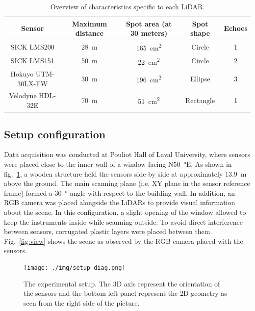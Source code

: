 \begin{table}[htbp]
    \centering
    \begin{tabular}{|c|c|c|c|c|}
        \hline
        \textbf{Sensor}     & \textbf{Maximum distance}  & \textbf{Spot area (at 30 meters)}  & \textbf{Spot shape} & \textbf{Echoes} \\\hline
        SICK LMS200         & \SI{28}{\meter}            & \SI{165}{\centi\meter\squared}     & Circle              & 1               \\\hline
        SICK LMS151         & \SI{50}{\meter}            & \SI{22}{\centi\meter\squared}      & Circle              & 2               \\\hline
        Hokuyo UTM-30LX-EW  & \SI{30}{\meter}            & \SI{196}{\centi\meter\squared}     & Ellipse             & 3               \\\hline
        Velodyne HDL-32E    & \SI{70}{\meter}            & \SI{51}{\centi\meter\squared}      & Rectangle           & 1               \\\hline
    \end{tabular}
    \caption{Overview of characteristics specific to each LiDAR.}
    \label{tab:lidars}
\end{table}

\subsection{Setup configuration}

Data acquisition was conducted at Pouliot Hall of Laval University, where sensors were placed close to the inner wall of a window facing N\SI{50}{\degree}E. As shown in fig.~\ref{fig:setup}, a wooden structure held the sensors side by side at approximately \SI{13.9}{\meter} above the ground. The main scanning plane (i.e. XY plane in the sensor reference frame) formed a \SI{30}{\degree} angle with respect to the building wall. In addition, an RGB camera was placed alongside the LiDARs to provide visual information about the scene. In this configuration, a slight opening of the window allowed to keep the instruments inside while scanning outside. To avoid direct interference between sensors, corrugated plastic layers were placed between them. Fig.~\ref{fig:view} shows the scene as observed by the RGB camera placed with the sensors.

\begin{figure}[th]
    \centering
    \texttt{[image: ./img/setup\_diag.png]}
    \caption{The experimental setup. The 3D axis represent the orientation of the sensors and the bottom left panel represent the 2D geometry as seen from the right side of the picture.}
    \label{fig:setup}
\end{figure}

